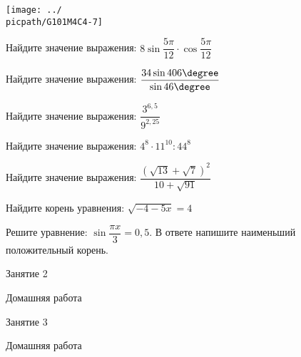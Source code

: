 \begin{homework}[number=1]
\begin{listofex}
\begin{minipage}[t]{\bodywidth}
		\end{minipage}
		\hspace{0.02\linewidth}
		\begin{minipage}[t]{\picwidth}
			\texttt{[image: ../\\picpath/G101M4C4-7]}
		\end{minipage}
		\item Найдите значение выражения: \( 8\sin{\dfrac{5\pi}{12}}\cdot\cos{\dfrac{5\pi}{12}} \)
		\item Найдите значение выражения: \( \dfrac{34\sin{406\degree}}{\sin{46\degree}} \)
		\item Найдите значение выражения: \( \dfrac{3^{6,5}}{9^{2,25}} \)
		\item Найдите значение выражения: \( 4^8 \cdot 11^{10} : 44^8 \)
		\item Найдите значение выражения: \( \dfrac{(\sqrt{13}+\sqrt{7})^2}{10+\sqrt{91}} \)
		\item Найдите корень уравнения: \( \sqrt{-4-5x}=4 \)
		\item Решите уравнение: \( \sin{\dfrac{\pi x}{3}}=0,5 \). В ответе напишите наименьший положительный корень.
	\end{listofex}
\end{homework}

\begin{class}[number=2]
	\begin{listofex}
		\item Занятие 2
	\end{listofex}
\end{class}

\begin{homework}[number=2]
	\begin{listofex}
		\item Домашняя работа
	\end{listofex}
\end{homework}

\begin{class}[number=3]
	\begin{listofex}
		\item Занятие 3
	\end{listofex}
\end{class}

\begin{homework}[number=3]
	\begin{listofex}
		\item Домашняя работа
	\end{listofex}
\end{homework}

